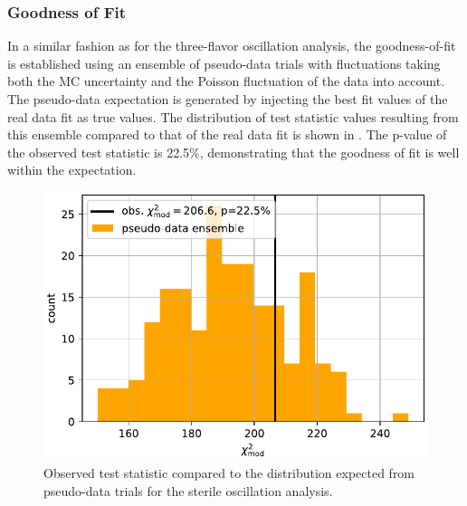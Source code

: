 \subsubsection{Goodness of Fit}
In a similar fashion as for the three-flavor oscillation analysis, the goodness-of-fit is established using an ensemble of pseudo-data trials with fluctuations taking both the MC uncertainty and the Poisson fluctuation of the data into account. The pseudo-data expectation is generated by injecting the best fit values of the real data fit as true values. The distribution of test statistic values resulting from this ensemble compared to that of the real data fit is shown in . The p-value of the observed test statistic is 22.5\%, demonstrating that the goodness of fit is well within the expectation. 

\begin{figure}
    \centering
    \includegraphics[width=0.8\linewidth]{figures/measurement/sterile_analysis/results/compare_ts_to_ensemble_REAL_DATA_FIT_v12_ext_holeice.pdf}
    \caption{Observed test statistic compared to the distribution expected from pseudo-data trials for the sterile oscillation analysis.}
    \label{fig:sterile-modchi2-ensemble-comparison}
\end{figure}


